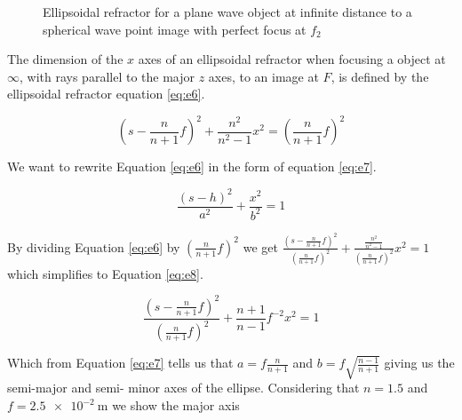 \documentclass[main.tex]{subfiles}
\begin{document}
\begin{figure}
\centering{}
\caption{Ellipsoidal refractor for a plane wave object at infinite distance to a spherical wave point image with perfect focus at $f_2$}
\label{fig:3}
\end{figure}

The dimension of the $x$ axes of an ellipsoidal refractor when focusing a object at $\infty$, with rays parallel to the major $z$ axes, to an image at $F$, is defined by the ellipsoidal refractor equation \ref{eq:e6}.

\begin{equation}\label{eq:e6}
\left(s-\frac{n}{n+1}f \right)^2 + \frac{n^2}{n^2 - 1}x^2 = \left(\frac{n}{n+1}f \right)^2
\end{equation}

We want to rewrite Equation \ref{eq:e6} in the form of equation \ref{eq:e7}.

\begin{equation}\label{eq:e7}
\frac{(s-h)^2}{a^2} + \frac{x^2}{b^2} = 1 
\end{equation}

By dividing Equation \ref{eq:e6} by $\left(\frac{n}{n+1}f\right)^2$ we get $\frac{\left(s-\frac{n}{n+1}f \right)^2}{\left(\frac{n}{n+1}f\right)^2} + \frac{\frac{n^2}{n^2 - 1}}{\left(\frac{n}{n+1}f\right)^2}x^2 = 1$ which simplifies to Equation \ref{eq:e8}.

\begin{equation}\label{eq:e8}
\frac{\left(s-\frac{n}{n+1}f \right)^2}{\left(\frac{n}{n+1}f\right)^2} + 
\frac{n + 1}{n-1} f^{-2} x^2 = 1
\end{equation}

Which from Equation \ref{eq:e7} tells us that $a=f\frac{n}{n+1}$ and $b= f\sqrt{\frac{n-1}{n+1}}$ giving us the semi-major and semi- minor axes of the ellipse. Considering that $n=1.5$ and $f =  \SI{2.5e-2}{\meter}$ we show the major axis
\end{document}

